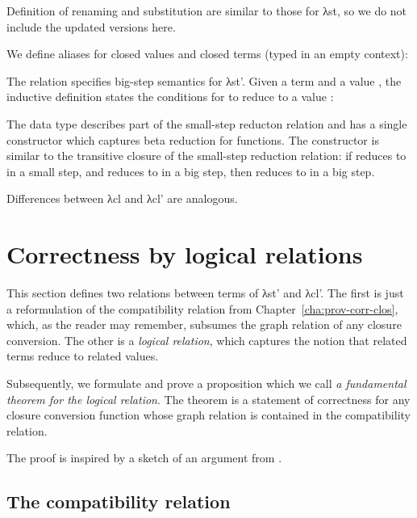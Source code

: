 \documentclass[bsc,frontabs,oneside,singlespacing,parskip,deptreport]{infthesis}
\theoremstyle{definition}
\theoremstyle{lemma}
\begin{document}
Definition of renaming and substitution are similar to those for
λst, so we do not include the updated versions here.

We define aliases for closed values  and closed terms
 (typed in an empty context):


The  relation specifies big-step semantics for λst'.  Given a
term  and a value , the inductive definition 
states the conditions for  to reduce to a value :


The  data type describes part of the small-step reducton
relation and has a single constructor which captures beta reduction
for functions. The  constructor is similar to the transitive
closure of the small-step reduction relation: if  reduces to
 in a small step, and  reduces to  in a big step,
then  reduces to  in a big step.

Differences between λcl and λcl' are analogous.

\section{Correctness by logical relations}
\label{sec:corr-logic-relat}

This section defines two relations between terms of λst' and λcl'. The
first is just a reformulation of the compatibility relation from
Chapter~\ref{cha:prov-corr-clos}, which, as the reader may remember,
subsumes the graph relation of any closure conversion. The other is a
\textit{logical relation}, which captures the notion that related
terms reduce to related values.

Subsequently, we formulate and prove a proposition which we call
\textit{a fundamental theorem for the logical relation}. The theorem
is a statement of correctness for any closure conversion function
whose graph relation is contained in the compatibility relation.

The proof is inspired by a sketch of an argument from
\cite{DBLP:conf/popl/MinamideMH96}.

\subsection{The compatibility relation}
\label{sec:lr-compat-rel}
\end{document}
